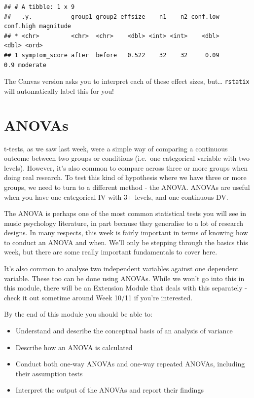 \documentclass[
]{book}
\providecommand{\tightlist}{%
  \setlength{\itemsep}{0pt}\setlength{\parskip}{0pt}}
\begin{document}
\begin{verbatim}
## # A tibble: 1 x 9
##   .y.           group1 group2 effsize    n1    n2 conf.low conf.high magnitude
## * <chr>         <chr>  <chr>    <dbl> <int> <int>    <dbl>     <dbl> <ord>    
## 1 symptom_score after  before   0.522    32    32     0.09       0.9 moderate
\end{verbatim}

The Canvas version asks you to interpret each of these effect sizes, but\ldots{} \texttt{rstatix} will automatically label this for you!

\chapter{ANOVAs}\label{anovas}

t-tests, as we saw last week, were a simple way of comparing a
continuous outcome between two groups or conditions (i.e.~one
categorical variable with two levels). However, it's also common to
compare across three or more groups when doing real research. To test
this kind of hypothesis where we have three or more groups, we need to
turn to a different method - the ANOVA. ANOVAs are useful when you have
one categorical IV with 3+ levels, and one continuous DV.

The ANOVA is perhaps one of the most common statistical tests you will
see in music psychology literature, in part because they generalise to a
lot of research designs. In many respects, this week is fairly important
in terms of knowing how to conduct an ANOVA and when. We'll only be
stepping through the basics this week, but there are some really
important fundamentals to cover here.

It's also common to analyse two independent variables against one
dependent variable. These too can be done using ANOVAs. While we won't
go into this in this module, there will be an Extension Module that
deals with this separately - check it out sometime around Week 10/11 if
you're interested.

By the end of this module you should be able to:

\begin{itemize}
\tightlist
\item
  Understand and describe the conceptual basis of an analysis of
  variance
\item
  Describe how an ANOVA is calculated
\item
  Conduct both one-way ANOVAs and one-way repeated ANOVAs, including
  their assumption tests
\item
  Interpret the output of the ANOVAs and report their findings
\end{itemize}
\end{document}
